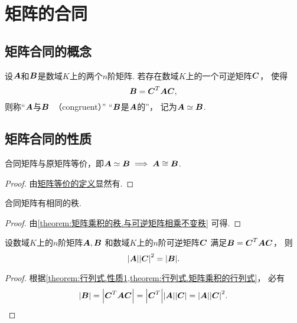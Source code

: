 \section{矩阵的合同}
\subsection{矩阵合同的概念}
\begin{definition}
设\(\boldsymbol{A}\)和\(\boldsymbol{B}\)是数域\(K\)上的两个\(n\)阶矩阵.
若存在数域\(K\)上的一个可逆矩阵\(\boldsymbol{C}\)，
使得\begin{equation*}
	\boldsymbol{B}=\boldsymbol{C}^T\boldsymbol{A}\boldsymbol{C},
\end{equation*}
则称“\(\boldsymbol{A}\)与\(\boldsymbol{B}\)~（congruent）”
“\(\boldsymbol{B}\)是\(\boldsymbol{A}\)的”，
记为\(\boldsymbol{A}\simeq\boldsymbol{B}\).
\end{definition}

\subsection{矩阵合同的性质}
\begin{property}
合同矩阵与原矩阵等价，即\(\boldsymbol{A}\simeq\boldsymbol{B} \implies \boldsymbol{A}\cong\boldsymbol{B}\).
\begin{proof}
由\hyperref[definition:逆矩阵.矩阵等价]{矩阵等价的定义}显然有.
\end{proof}
\end{property}

\begin{property}
合同矩阵有相同的秩.
\begin{proof}
由\cref{theorem:矩阵乘积的秩.与可逆矩阵相乘不变秩} 可得.
\end{proof}
\end{property}

\begin{proposition}\label{theorem:矩阵合同.合同矩阵的行列式的关系}
设数域\(K\)上的\(n\)阶矩阵\(\boldsymbol{A},\boldsymbol{B}\)
和数域\(K\)上的\(n\)阶可逆矩阵\(\boldsymbol{C}\)
满足\(\boldsymbol{B} = \boldsymbol{C}^T \boldsymbol{A} \boldsymbol{C}\)，
则\begin{equation*}
	\abs{\boldsymbol{A}} \abs{\boldsymbol{C}}^2
	= \abs{\boldsymbol{B}}.
\end{equation*}
\begin{proof}
根据\cref{theorem:行列式.性质1,theorem:行列式.矩阵乘积的行列式}，
必有\begin{equation*}
	\abs{\boldsymbol{B}}
	= \abs{\boldsymbol{C}^T \boldsymbol{A} \boldsymbol{C}}
	= \abs{\boldsymbol{C}^T} \abs{\boldsymbol{A}} \abs{\boldsymbol{C}}
	= \abs{\boldsymbol{A}} \abs{\boldsymbol{C}}^2.
	\qedhere
\end{equation*}
\end{proof}
\end{proposition}

